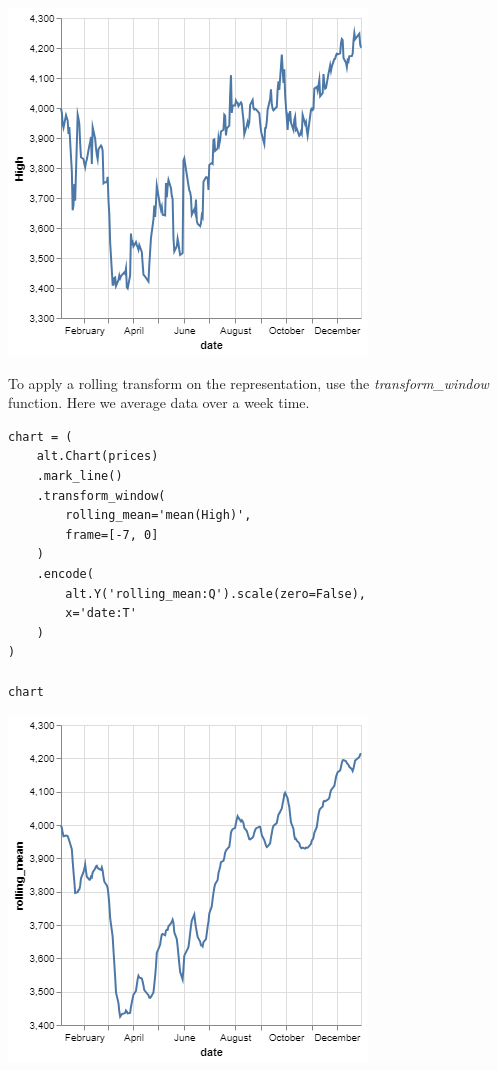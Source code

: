 \documentclass[11pt]{article}
\begin{document}
\begin{center}
\includegraphics[width=.7\textwidth]{visualization (8).png}
\end{center}

To apply a rolling transform on the representation, use the \textit{transform\_window} function. Here we average data over a week time.

\begin{verbatim}
chart = (
    alt.Chart(prices)
    .mark_line()
    .transform_window(
        rolling_mean='mean(High)',
        frame=[-7, 0]
    )
    .encode(
        alt.Y('rolling_mean:Q').scale(zero=False),
        x='date:T'
    )
)

chart
\end{verbatim}

\begin{center}
\includegraphics[width=.7\textwidth]{visualization (9).png}
\end{center}
\end{document}
